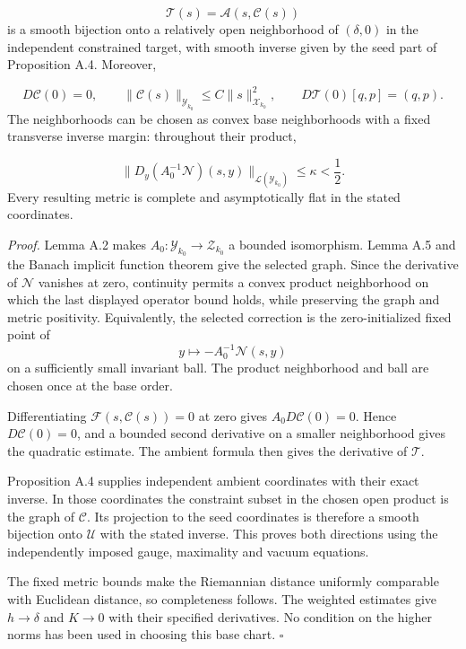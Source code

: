 \documentclass[
  english,
  11pt,
  reqno]{amsart}
\begin{document}
\label{eq:online-chart-nonlinear-constructor} \[
\mathcal T(s)=\mathcal A(s,\mathcal C(s))
\] is a smooth bijection onto a relatively open neighborhood of
\((\delta,0)\) in the independent constrained target, with smooth
inverse given by the seed part of Proposition A.4. Moreover,

\label{eq:online-chart-quadratic-correction-bound} \[
D\mathcal C(0)=0,\qquad
\|\mathcal C(s)\|_{\mathcal Y_{k_0}}
\le C\|s\|_{\mathcal X_{k_0}}^2,
\qquad D\mathcal T(0)[q,p]=(q,p).
\] The neighborhoods can be chosen as convex base neighborhoods with a
fixed transverse inverse margin: throughout their product,

\label{eq:online-chart-uniform-base-inverse-margin} \[
\|D_y(A_0^{-1}\mathcal N)(s,y)\|
_{\mathcal L(\mathcal Y_{k_0})}\le\kappa<\frac12.
\] Every resulting metric is complete and asymptotically flat in the
stated coordinates.

\emph{Proof.} Lemma A.2 makes
\(A_0:\mathcal Y_{k_0}\to\mathcal Z_{k_0}\) a bounded isomorphism. Lemma
A.5 and the Banach implicit function theorem give the selected graph.
Since the derivative of \(\mathcal N\) vanishes at zero, continuity
permits a convex product neighborhood on which the last displayed
operator bound holds, while preserving the graph and metric positivity.
Equivalently, the selected correction is the zero-initialized fixed
point of \[
y\longmapsto-A_0^{-1}\mathcal N(s,y)
\] on a sufficiently small invariant ball. The product neighborhood and
ball are chosen once at the base order.

Differentiating \(\mathcal F(s,\mathcal C(s))=0\) at zero gives
\(A_0D\mathcal C(0)=0\). Hence \(D\mathcal C(0)=0\), and a bounded
second derivative on a smaller neighborhood gives the quadratic
estimate. The ambient formula then gives the derivative of
\(\mathcal T\).

Proposition A.4 supplies independent ambient coordinates with their
exact inverse. In those coordinates the constraint subset in the chosen
open product is the graph of \(\mathcal C\). Its projection to the seed
coordinates is therefore a smooth bijection onto \(\mathcal U\) with the
stated inverse. This proves both directions using the independently
imposed gauge, maximality and vacuum equations.

The fixed metric bounds make the Riemannian distance uniformly
comparable with Euclidean distance, so completeness follows. The
weighted estimates give \(h\to\delta\) and \(K\to0\) with their
specified derivatives. No condition on the higher norms has been used in
choosing this base chart. \hfill\(\square\)
\end{document}
